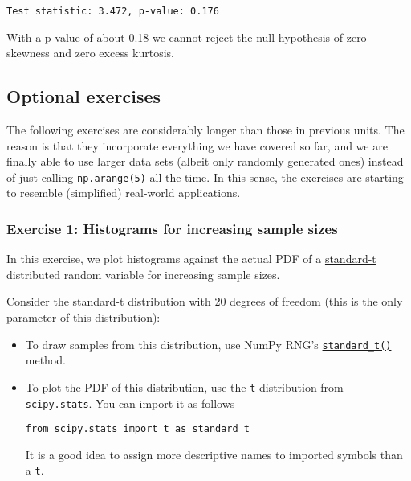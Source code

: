 \documentclass{scrartcl}
\begin{document}
    \begin{Verbatim}[commandchars=\\\{\}]
Test statistic: 3.472, p-value: 0.176
    \end{Verbatim}

    With a p-value of about 0.18 we cannot reject the null hypothesis of
zero skewness and zero excess kurtosis.


\hypertarget{optional-exercises}{%
\subsection{Optional exercises}\label{optional-exercises}}

The following exercises are considerably longer than those in previous
units. The reason is that they incorporate everything we have covered so
far, and we are finally able to use larger data sets (albeit only
randomly generated ones) instead of just calling \texttt{np.arange(5)}
all the time. In this sense, the exercises are starting to resemble
(simplified) real-world applications.

    \hypertarget{exercise-1-histograms-for-increasing-sample-sizes}{%
\subsubsection{Exercise 1: Histograms for increasing sample
sizes}\label{exercise-1-histograms-for-increasing-sample-sizes}}

In this exercise, we plot histograms against the actual PDF of a
\href{https://en.wikipedia.org/wiki/Student\%27s_t-distribution}{standard-t}
distributed random variable for increasing sample sizes.

Consider the standard-t distribution with 20 degrees of freedom (this is
the only parameter of this distribution):

\begin{itemize}
\item
  To draw samples from this distribution, use NumPy RNG's
  \href{https://numpy.org/doc/stable/reference/random/generated/numpy.random.Generator.standard_t.html}{\texttt{standard\_t()}}
  method.
\item
  To plot the PDF of this distribution, use the
  \href{https://docs.scipy.org/doc/scipy/reference/generated/scipy.stats.t.html}{\texttt{t}}
  distribution from \texttt{scipy.stats}. You can import it as follows

\begin{verbatim}
from scipy.stats import t as standard_t
\end{verbatim}

  It is a good idea to assign more descriptive names to imported symbols
  than a \texttt{t}.
\end{itemize}
\end{document}
